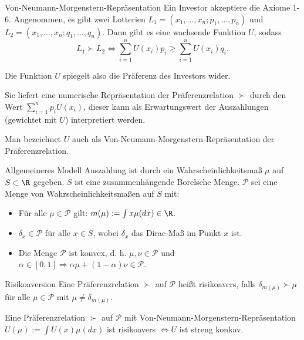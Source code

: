 \begin{karte}{Von-Neumann-Morgenstern-Repräsentation}
Ein Investor akzeptiere die Axiome 1-6. Angenommen, es gibt zwei Lotterien 
\(L_1 = (x_1, \ldots, x_n; p_1, \ldots, p_n)\) und \(L_2 = (x_1, \ldots, x_n; q_1, \ldots, q_n)\). 
Dann gibt es eine wachsende Funktion \(U\), sodass 
\[ L_1 \succ L_2 \Leftrightarrow \sum_{i=1}^n U(x_i) p_i \geq \sum_{i=1}^n U(x_i) q_i. \]

Die Funktion \(U\) spiegelt also die Präferenz des Investors wider. 

Sie liefert eine numerische Repräsentation der Präferenzrelation \(\succ\) 
durch den Wert \(\sum_{i=1}^n p_i U(x_i)\), dieser kann als Erwartungswert der Auszahlungen 
(gewichtet mit \(U\)) interpretiert werden. 

Man bezeichnet \(U\) auch als 
Von-Neumann-Morgenstern-Repräsentation der Präferenzrelation.
\end{karte}

\begin{karte}{Allgemeineres Modell}
Auszahlung ist durch ein Wahrscheinlichkeitsmaß \(\mu\) auf \(S\subset \R\) gegeben. 
\(S\) ist eine zusammenhängende Borelsche Menge. \(\mathcal{P}\) sei eine Menge von Wahrscheinlichkeitsmaßen 
auf \(S\) mit: 
\begin{itemize}
    \item Für alle \(\mu \in \mathcal{P}\) gilt: \(m(\mu) := \int x \mu(dx) \in \R\). 
    \item \(\delta_x \in \mathcal{P}\) für alle \(x\in S\), wobei \(\delta_x\) 
    das Dirac-Maß im Punkt \(x\) ist. 
    \item Die Menge \(\mathcal{P}\) ist konvex, d. h. \(\mu,\nu \in \mathcal{P}\) und 
    \(\alpha \in [0,1] \Rightarrow \alpha\mu + (1-\alpha) \nu \in \mathcal{P}\).
\end{itemize}
\end{karte}

\begin{karte}{Risikoaversion}
Eine Präferenzrelation \(\succ\) auf \(\mathcal{P}\) heißt risikoavers, falls 
\(\delta_{m(\mu)} \succ \mu\) für alle \(\mu \in \mathcal{P}\) mit 
\(\mu \neq \delta_{m(\mu)}\).

Eine Präferenzrelation \(\succ\) auf \(\mathcal{P}\) mit Von-Neumann-Morgenstern-Repräsentation 
\(U(\mu) := \int U(x) \mu(dx)\) ist risikoavers \(\Leftrightarrow U\) ist streng konkav.
\end{karte}